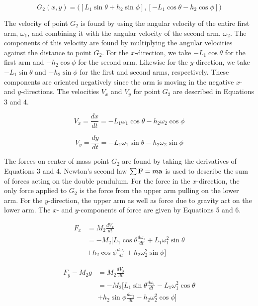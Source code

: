 \documentclass[%
 aip,
 amsmath,amssymb,
 reprint,%
 floatfix,%
]{revtex4-1}
\begin{document}
\begin{equation}
	G_2(x,y) = \Big([L_1 \sin{\theta} + h_2 \sin{\phi}],  [- L_1 \cos{\theta} - h_2 \cos{\phi}]\Big)
\end{equation}

The velocity of point $G_2$ is found by using the angular velocity of the entire first arm, $\omega_1$, and combining it with the angular velocity of the second arm, $\omega_2$. The components of this velocity are found by multiplying the angular velocities against the distance to point $G_2$. For the $x$-direction, we take $-L_1 \cos{\theta}$ for the first arm and $-h_2 \cos{\phi}$ for the second arm. Likewise for the $y$-direction, we take $-L_1 \sin{\theta}$ and $-h_2 \sin{\phi}$ for the first and second arms, respectively. These components are oriented negatively since the arm is moving in the negative $x$- and $y$-directions. The velocities $V_x$ and $V_y$ for point $G_2$ are described in Equations 3 and 4.

\begin{equation}
	V_x = \frac{dx}{dt} = -L_1 \omega_1 \cos{\theta} - h_2 \omega_2 \cos{\phi}
\end{equation}

\begin{equation}
	V_y = \frac{dy}{dt} = -L_1 \omega_1 \sin{\theta} - h_2 \omega_2 \sin{\phi}
\end{equation}

The forces on center of mass point $G_2$ are found by taking the derivatives of Equations 3 and 4. Newton's second law $\sum \bold{F} = m \bold{a}$ is used to describe the sum of forces acting on the double pendulum. For the force in the $x$-direction, the only force applied to $G_2$ is the force from the upper arm pulling on the lower arm. For the $y$-direction, the upper arm as well as force due to gravity act on the lower arm. The $x$- and $y$-components of force are given by Equations 5 and 6.

\begin{equation}
	\begin{aligned}
		F_x & = M_2 \frac{d V_x}{dt} \\
		    & = -M_2 \bigg [ L_1 \cos{\theta} \frac{d \omega_1}{dt} + L_1 \omega_1^2 \sin{\theta} \\
		    & + h_2 \cos{\phi} \frac{d \omega_2}{dt} + h_2 \omega_2^2 \sin{\phi} \bigg ]
	\end{aligned}
\end{equation}

\begin{equation}
	\begin{aligned}
		F_y - M_2 g & = M_2 \frac{d V_y}{dt}\\
		   & = -M_2 \bigg [ L_1 \sin{\theta} \frac{d \omega_1}{dt} - L_1 \omega_1^2 \cos{\theta} \\
		   & + h_2 \sin{\phi} \frac{d \omega_2}{dt} - h_2 \omega_2^2 \cos{\phi} \bigg ]
	\end{aligned}
\end{equation}
\end{document}
